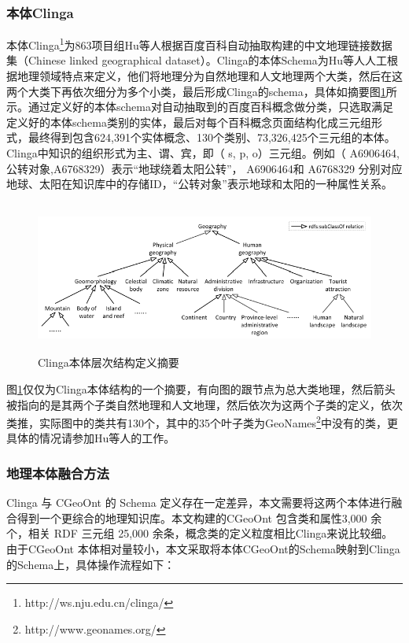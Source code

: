 \subsubsection{本体Clinga}

本体Clinga\footnote{http://ws.nju.edu.cn/clinga/}为863项目组Hu\cite{Hu}等人根据百度百科自动抽取构建的中文地理链接数据集（Chinese linked geographical dataset）。Clinga的本体Schema为Hu等人人工根据地理领域特点来定义，他们将地理分为自然地理和人文地理两个大类，然后在这两个大类下再依次细分为多个小类，最后形成Clinga的schema，具体如摘要图\ref{fig:clinga}所示。通过定义好的本体schema对自动抽取到的百度百科概念做分类，只选取满足定义好的本体schema类别的实体，最后对每个百科概念页面结构化成三元组形式，最终得到包含624,391个实体概念、130个类别、73,326,425个三元组的本体。Clinga中知识的组织形式为主、谓、宾，即（ s, p, o）三元组。例如（ A6906464, 公转对象,A6768329）表示“地球绕着太阳公转”， A6906464和 A6768329 分别对应地球、太阳在知识库中的存储ID，“公转对象”表示地球和太阳的一种属性关系。

\begin{figure}[!htb]
	\centering\includegraphics[height=5cm]{resource/clinga}
	\caption{Clinga本体层次结构定义摘要}
	\label{fig:clinga}
\end{figure}

图\ref{fig:clinga}仅仅为Clinga本体结构的一个摘要，有向图的跟节点为总大类地理，然后箭头被指向的是其两个子类自然地理和人文地理，然后依次为这两个子类的定义，依次类推，实际图中的类共有130个，其中的35个叶子类为GeoNames\footnote{http://www.geonames.org/}中没有的类，更具体的情况请参加Hu等人的工作。

\subsubsection{地理本体融合方法}
Clinga 与 CGeoOnt 的 Schema 定义存在一定差异，本文需要将这两个本体进行融合得到一个更综合的地理知识库。本文构建的CGeoOnt 包含类和属性3,000 余个，相关 RDF 三元组 25,000 余条，概念类的定义粒度相比Clinga来说比较细。由于CGeoOnt 本体相对量较小，本文采取将本体CGeoOnt的Schema映射到Clinga的Schema上，具体操作流程如下：


